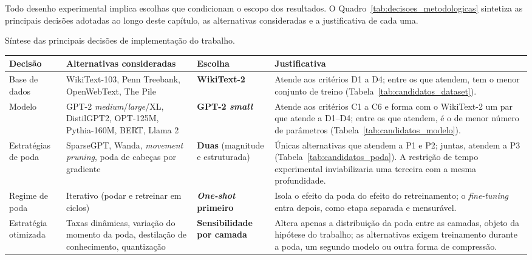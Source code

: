 Todo desenho experimental implica escolhas que condicionam o escopo dos resultados. O
Quadro~\ref{tab:decisoes_metodologicas} sintetiza as principais decisões adotadas ao longo
deste capítulo, as alternativas consideradas e a justificativa de cada uma.

\begin{quadro}[htbp]
\centering
\caption{Síntese das principais decisões de implementação do trabalho.}
\label{tab:decisoes_metodologicas}
\small
\begin{tabular}{>{\raggedright\arraybackslash}p{2.4cm} >{\raggedright\arraybackslash}p{3.4cm} >{\raggedright\arraybackslash}p{2.6cm} >{\raggedright\arraybackslash}p{5.1cm}}
\hline
\textbf{Decisão} & \textbf{Alternativas consideradas} & \textbf{Escolha} & \textbf{Justificativa} \\
\hline

Base de dados
& WikiText-103, Penn Treebank, OpenWebText, The Pile
& \textbf{WikiText-2}
& Atende aos critérios D1 a D4; entre os que
  atendem, tem o menor conjunto de treino (Tabela~\ref{tab:candidatos_dataset}). \\

Modelo
& GPT-2 \textit{medium}/\textit{large}/XL, DistilGPT2, OPT-125M, Pythia-160M, BERT, Llama 2
& \textbf{GPT-2 \textit{small}}
& Atende aos critérios C1 a C6 e forma com o
  WikiText-2 um par que atende a D1--D4; entre os que atendem, é o de menor número de
  parâmetros (Tabela~\ref{tab:candidatos_modelo}). \\

Estratégias de poda
& SparseGPT, Wanda, \textit{movement pruning}, poda de cabeças por gradiente
& \textbf{Duas} (magnitude e estruturada)
& Únicas alternativas que atendem a P1 e P2; juntas, atendem a P3
  (Tabela~\ref{tab:candidatos_poda}). A restrição de tempo experimental inviabilizaria uma
  terceira com a mesma profundidade. \\

Regime de poda
& Iterativo (podar e retreinar em ciclos)
& \textbf{\textit{One-shot} primeiro}
& Isola o efeito da poda do efeito do retreinamento; o \textit{fine-tuning} entra depois,
  como etapa separada e mensurável. \\

Estratégia otimizada
& Taxas dinâmicas, variação do momento da poda, destilação de conhecimento, quantização
& \textbf{Sensibilidade por camada}
& Altera apenas a distribuição da poda entre as camadas, objeto da hipótese do trabalho;
  as alternativas exigem treinamento durante a poda,
  um segundo modelo ou outra forma de compressão. \\


\end{tabular}
\end{quadro}
